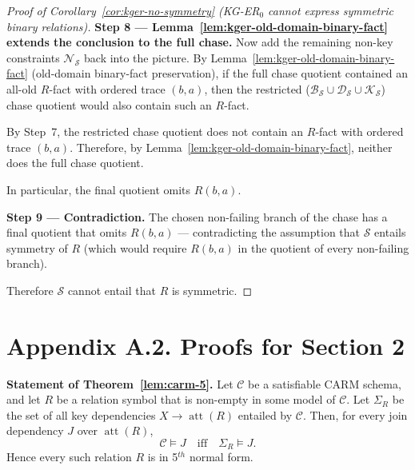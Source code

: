 \documentclass[10pt]{article}
\begin{document}
\begin{proof}[Proof of Corollary~\ref{cor:kger-no-symmetry} (KG-ER$_0$ cannot express symmetric binary relations)]
\smallskip\noindent\textbf{Step 8 ---
Lemma~\ref{lem:kger-old-domain-binary-fact} extends the conclusion to
the full chase.}
Now add the remaining non-key constraints \(\mathcal N_{\mathcal S}\)
back into the picture.  By
Lemma~\ref{lem:kger-old-domain-binary-fact} (old-domain binary-fact
preservation), if the full chase quotient contained an all-old
\(R\)-fact with ordered trace \((b,a)\), then the restricted
(\(\mathcal B_{\mathcal S}\cup\mathcal D_{\mathcal S}\cup
\mathcal K_{\mathcal S}\)) chase quotient would also contain such an
\(R\)-fact.

By Step~7, the restricted chase quotient does not contain an
\(R\)-fact with ordered trace \((b,a)\).  Therefore, by
Lemma~\ref{lem:kger-old-domain-binary-fact}, neither does the full
chase quotient.

In particular, the final quotient omits \(R(b,a)\).

\smallskip\noindent\textbf{Step 9 --- Contradiction.}
The chosen non-failing branch of the chase has a final quotient that
omits \(R(b,a)\) --- contradicting the assumption that
\(\mathcal S\) entails symmetry of \(R\) (which would require
\(R(b,a)\) in the quotient of every non-failing branch).

Therefore \(\mathcal S\) cannot entail that \(R\) is symmetric.
\end{proof}

\newpage
\section*{Appendix A.2. Proofs for Section 2}

\noindent\textbf{Statement of Theorem~\ref{lem:carm-5}.}
Let \(\mathcal C\) be a satisfiable \textsf{CARM} schema, and let \(R\)
be a relation symbol that is non-empty in some model of \(\mathcal C\).
Let \(\Sigma_R\) be the set of all key dependencies
\(X\to\operatorname{att}(R)\) entailed by \(\mathcal C\). Then, for every
join dependency \(J\) over \(\operatorname{att}(R)\),
\[
\mathcal C\models J
\quad\text{iff}\quad
\Sigma_R\models J .
\]
Hence every such relation \(R\) is in 5$^{th}$ normal form.
\end{document}
